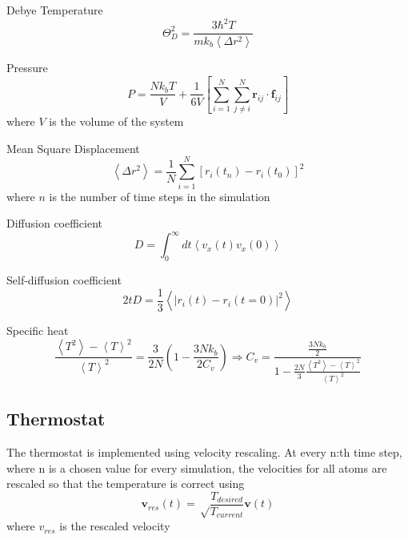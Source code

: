\documentclass[12pt,a4paper]{article}
\begin{document}
Debye Temperature
\begin{equation}
\label{eq:debyetemperature}
\Theta_D^2=\frac{3 \hbar^2T}{mk_b \left< \Delta r^2\right>}
\end{equation}

Pressure
\begin{equation}
\label{eq:pressure}
P=\frac{Nk_bT}{V} + \frac 1 {6V} \left[\sum_{i=1}^N \sum_{j\not=i}^N  \mathbf r_{ij} \cdot \mathbf f_{ij} \right]
\end{equation}
where \(V\) is the volume of the system

Mean Square Displacement
\begin{equation}
\label{eq:MSD}
\left< \Delta r^2 \right>= \frac 1 N \sum_{i=1}^N \left[ r_i(t_n)-r_i(t_0) \right]^2
\end{equation}
where \( n\) is the number of time steps in the simulation

Diffusion coefficient
\begin{equation}
\label{eq:diffCoeff}
D= \int_0^\infty dt \left< v_x(t)v_x(0)\right>
\end{equation}

Self-diffusion coefficient
\begin{equation}
\label{eq:selfDiffCoeff}
2tD=\frac 1 3 \left<|r_i(t)-r_i(t=0)|^2 \right>
\end{equation}

Specific heat
\begin{equation}
\label{eq:specHeat}
\frac{\left< T^2\right> - \left< T \right>^2}{\left< T\right>^2} = \frac 3{2N} \left(1-\frac{3Nk_b}{2C_v} \right) \Rightarrow
C_v =\frac{\frac{3Nk_b} 2}{1-\frac{2N} 3 \frac{\left< T^2\right> - \left< T \right>^2}{\left< T\right>^2}}
\end{equation}

\subsection{Thermostat}
\label{sec:thermostat}

The thermostat is implemented using velocity rescaling.
At every n:th time step, where n is a chosen value for every simulation, the velocities for all atoms are rescaled so that the temperature is correct using
\begin{equation}
\mathbf v_{res}(t)=\sqrt \frac {T_{desired}} {T_{current}} \mathbf v(t)
\end{equation}
where \( v_{res}\) is the rescaled velocity

\end{document}
